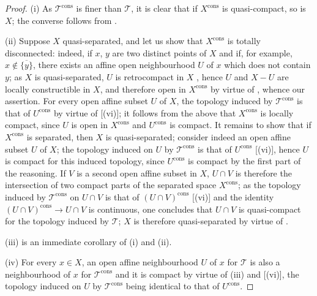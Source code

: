 \begin{proof}
(i) As $\mathscr{T}^{\mathrm{cons}}$ is finer than $\mathscr{T}$, it is clear that if $X^{\mathrm{cons}}$ is quasi-compact, so is $X$; the converse follows from .

(ii) Suppose $X$ quasi-separated, and let us show that $X^{\mathrm{cons}}$ is totally disconnected: indeed, if $x$, $y$ are two distinct points of $X$ and if, for example, $x\notin\overline{\{y\}}$, there exists an affine open neighbourhood $U$ of $x$ which does not contain $y$; as $X$ is quasi-separated, $U$ is retrocompact in $X$ , hence $U$ and $X-U$ are locally constructible in $X$, and therefore open in $X^{\mathrm{cons}}$ by virtue of , whence our assertion.
For every open affine subset $U$ of $X$, the topology induced by $\mathscr{T}^{\mathrm{cons}}$ is that of $U^{\mathrm{cons}}$ by virtue of [(vi)]; it follows from the above that $X^{\mathrm{cons}}$ is locally compact, since $U$ is open in $X^{\mathrm{cons}}$ and $U^{\mathrm{cons}}$ is compact.
It remains to show that if $X^{\mathrm{cons}}$ is separated, then $X$ is quasi-separated; consider indeed an open affine subset $U$ of $X$; the topology induced on $U$ by $\mathscr{T}^{\mathrm{cons}}$ is that of $U^{\mathrm{cons}}$ [(vi)], hence $U$ is compact for this induced topology, since $U^{\mathrm{cons}}$ is compact by the first part of the reasoning.
If $V$ is a second open affine subset in $X$, $U\cap V$ is therefore the intersection of two compact parts of the separated space $X^{\mathrm{cons}}$; as the topology induced by $\mathscr{T}^{\mathrm{cons}}$ on $U\cap V$ is that of $(U\cap V)^{\mathrm{cons}}$ [(vi)] and the identity $(U\cap V)^{\mathrm{cons}}\to U\cap V$ is continuous, one concludes that $U\cap V$ is quasi-compact for the topology induced by $\mathscr{T}$; $X$ is therefore quasi-separated by virtue of .

(iii) is an immediate corollary of (i) and (ii).

(iv) For every $x\in X$, an open affine neighbourhood $U$ of $x$ for $\mathscr{T}$ is also a neighbourhood of $x$ for $\mathscr{T}^{\mathrm{cons}}$ and it is compact by virtue of (iii) and [(vi)], the topology induced on $U$ by $\mathscr{T}^{\mathrm{cons}}$ being identical to that of $U^{\mathrm{cons}}$.


\end{proof}
